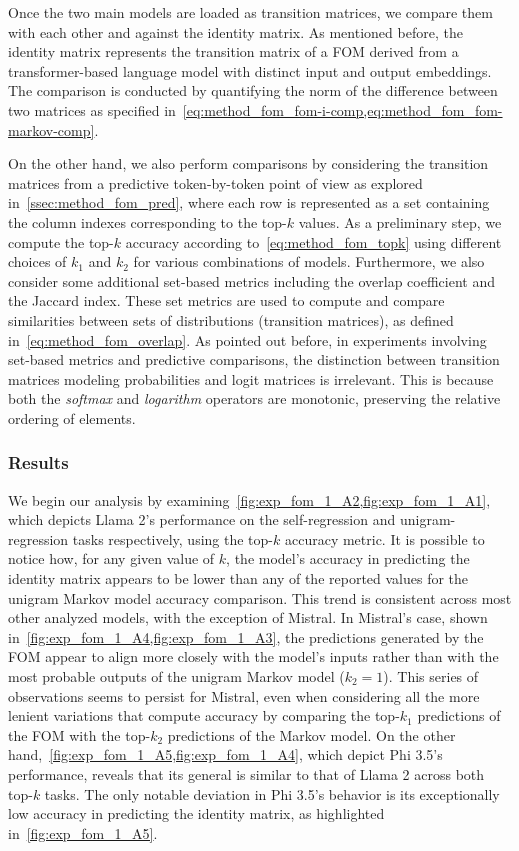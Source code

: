 Once the two main models are loaded as transition matrices, we compare them with each other and against the identity matrix.
As mentioned before, the identity matrix represents the transition matrix of a FOM derived from a transformer-based language model with distinct input and output embeddings.
The comparison is conducted by quantifying the norm of the difference between two matrices as specified in~\cref{eq:method_fom_fom-i-comp,eq:method_fom_fom-markov-comp}.

On the other hand, we also perform comparisons by considering the transition matrices from a predictive token-by-token point of view as explored in~\cref{ssec:method_fom_pred}, where each row is represented as a set containing the column indexes corresponding to the top-$k$ values.
As a preliminary step, we compute the top-$k$ accuracy according to~\cref{eq:method_fom_topk} using different choices of $k_1$ and $k_2$ for various combinations of models.
Furthermore, we also consider some additional set-based metrics including the overlap coefficient and the Jaccard index.
These set metrics are used to compute and compare similarities between sets of distributions (transition matrices), as defined in~\cref{eq:method_fom_overlap}.
As pointed out before, in experiments involving set-based metrics and predictive comparisons, the distinction between transition matrices modeling probabilities and logit matrices is irrelevant.
This is because both the \emph{softmax} and \emph{logarithm} operators are monotonic, preserving the relative ordering of elements.

\subsubsection{Results}\label{sssec:exp_fom_exp1_results}

We begin our analysis by examining~\cref{fig:exp_fom_1_A2,fig:exp_fom_1_A1}, which depicts Llama 2's performance on the self-regression and unigram-regression tasks respectively, using the top-$k$ accuracy metric.
It is possible to notice how, for any given value of $k$, the model's accuracy in predicting the identity matrix appears to be lower than any of the reported values for the unigram Markov model accuracy comparison.
This trend is consistent across most other analyzed models, with the exception of Mistral.
In Mistral's case, shown in~\cref{fig:exp_fom_1_A4,fig:exp_fom_1_A3}, the predictions generated by the FOM appear to align more closely with the model's inputs rather than with the most probable outputs of the unigram Markov model ($k_2 = 1$).
This series of observations seems to persist for Mistral, even when considering all the more lenient variations that compute accuracy by comparing the top-$k_1$ predictions of the FOM with the top-$k_2$ predictions of the Markov model.
On the other hand,~\cref{fig:exp_fom_1_A5,fig:exp_fom_1_A4}, which depict Phi 3.5's performance, reveals that its general is similar to that of Llama 2 across both top-$k$ tasks.
The only notable deviation in Phi 3.5's behavior is its exceptionally low accuracy in predicting the identity matrix, as highlighted in~\cref{fig:exp_fom_1_A5}.

